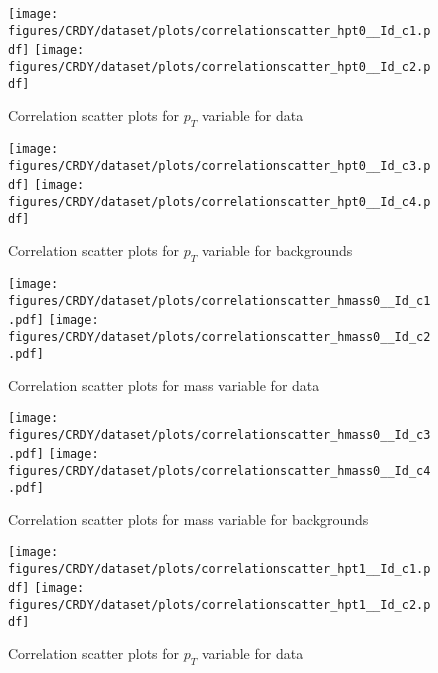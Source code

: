 \begin{figure}[!htb]%
\centering
\texttt{[image: figures/CRDY/dataset/plots/correlationscatter\_hpt0\_\_Id\_c1.pdf]}
\texttt{[image: figures/CRDY/dataset/plots/correlationscatter\_hpt0\_\_Id\_c2.pdf]}
\caption{ Correlation scatter plots for \HZZ $p_{T}$  variable for data}%
\label{fig:correlations_CRDY_hpt0_S}                                                       
\end{figure}\clearpage



\begin{figure}[!htb]%
\centering
\texttt{[image: figures/CRDY/dataset/plots/correlationscatter\_hpt0\_\_Id\_c3.pdf]}
\texttt{[image: figures/CRDY/dataset/plots/correlationscatter\_hpt0\_\_Id\_c4.pdf]}
\caption{ Correlation scatter plots for \HZZ $p_{T}$ variable for backgrounds}%
\label{fig:correlations_CRDY_hpt0_BG}                                                       
\end{figure}\clearpage


\begin{figure}[!htb]%
\centering
\texttt{[image: figures/CRDY/dataset/plots/correlationscatter\_hmass0\_\_Id\_c1.pdf]}
\texttt{[image: figures/CRDY/dataset/plots/correlationscatter\_hmass0\_\_Id\_c2.pdf]}
\caption{ Correlation scatter plots for \HZZ mass  variable for data}%
\label{fig:correlations_CRDY_hmass0_S}                                                       
\end{figure}\clearpage



\begin{figure}[!htb]%
\centering
\texttt{[image: figures/CRDY/dataset/plots/correlationscatter\_hmass0\_\_Id\_c3.pdf]}
\texttt{[image: figures/CRDY/dataset/plots/correlationscatter\_hmass0\_\_Id\_c4.pdf]}
\caption{ Correlation scatter plots for \HZZ mass variable for backgrounds}%
\label{fig:correlations_CRDY_hmass0_BG}                                                       
\end{figure}\clearpage




\begin{figure}[!htb]%
\centering
\texttt{[image: figures/CRDY/dataset/plots/correlationscatter\_hpt1\_\_Id\_c1.pdf]}
\texttt{[image: figures/CRDY/dataset/plots/correlationscatter\_hpt1\_\_Id\_c2.pdf]}
\caption{ Correlation scatter plots for \HBB $p_{T}$  variable for data}%
\label{fig:correlations_CRDY_hpt1_S}                                                       
\end{figure}\clearpage



